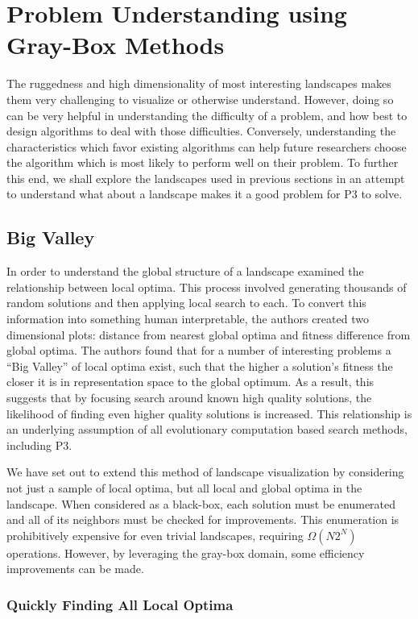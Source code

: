 \chapter{Problem Understanding using Gray-Box Methods}
The ruggedness and high dimensionality of most interesting landscapes makes them very challenging
to visualize or otherwise understand. However, doing so can be very helpful in
understanding the difficulty of a problem, and how best to design algorithms to deal
with those difficulties. Conversely, understanding the characteristics which favor
existing algorithms can help future researchers choose the algorithm which is
most likely to perform well on their problem. To further this end, we shall
explore the landscapes used in previous sections in an attempt to understand
what about a landscape makes it a good problem for P3 to solve.


\section{Big Valley}
 In order to understand the global structure of a landscape
\cite{boese:1994:bigvalley} examined the relationship between local optima.
This process involved generating thousands of random solutions and then applying
local search to each. To convert this information into something human interpretable,
the authors created two dimensional plots: distance from nearest global optima and
fitness difference from global optima.
The authors found that for a number of interesting problems a ``Big Valley'' of
local optima exist, such that the higher a solution's fitness the closer it is
in representation space to the global optimum. As a result, this suggests that
by focusing search around known high quality solutions, the likelihood of finding even
higher quality solutions is increased. This relationship is an underlying assumption
of all evolutionary computation based search methods, including P3.

We have set out to extend this method of landscape visualization by considering not
just a sample of local optima, but all local and global optima in the landscape.
When considered as a black-box, each solution must be enumerated and all of its
neighbors must be checked for improvements. This enumeration is prohibitively expensive for
even trivial landscapes, requiring $\Omega(N2^N)$ operations.
However, by leveraging the gray-box domain, some efficiency improvements can be made.

\subsection{Quickly Finding All Local Optima}

